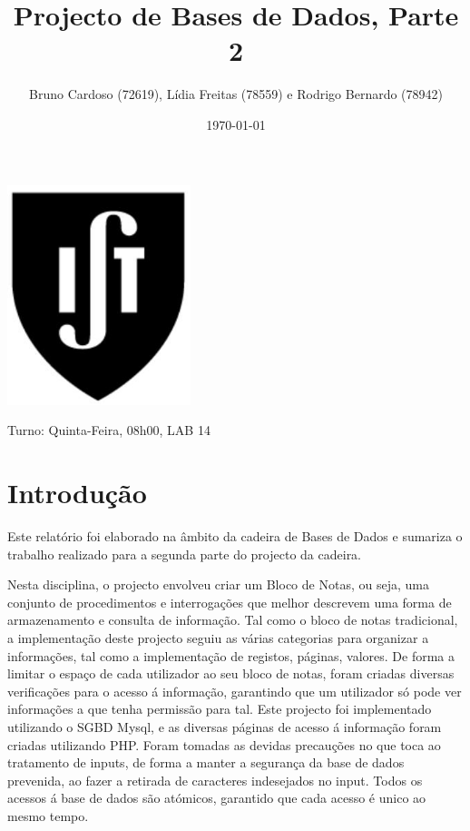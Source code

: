 \documentclass[11pt,a4paper]{article}
\title{\textbf{Projecto de Bases de Dados, Parte 2}}
\author{Bruno Cardoso (72619), Lídia Freitas (78559) e Rodrigo Bernardo (78942)}
\affil{Instituto Superior Técnico}
\begin{document}
\date {\today}

\maketitle
\thispagestyle{empty} %
\centerline{\includegraphics[width=0.4\textwidth]{ist-simbolo.jpg}}

\begin{description}[noitemsep]
	\item {}
	\item Turno: Quinta-Feira, 08h00, LAB 14
\end{description}

\newpage

\tableofcontents
\newpage

\section{Introdução}

Este relatório foi elaborado na âmbito da cadeira de Bases de Dados e sumariza o trabalho realizado para a segunda parte do projecto da cadeira.

Nesta disciplina, o projecto envolveu criar um Bloco de Notas, ou seja, uma conjunto de procedimentos e interrogações que melhor descrevem uma forma de armazenamento e consulta de informação. Tal como o bloco de notas tradicional, a implementação deste projecto seguiu as várias categorias para organizar a informações, tal como a implementação de registos, páginas, valores. De forma a limitar o espaço de cada utilizador ao seu bloco de notas, foram criadas diversas verificações para o acesso á informação, garantindo que um utilizador só pode ver informações a que tenha permissão para tal.
	Este projecto foi implementado utilizando o SGBD Mysql, e as diversas páginas de acesso á informação foram criadas utilizando PHP. Foram tomadas as devidas precauções no que toca ao tratamento de inputs, de forma a manter a segurança da base de dados prevenida, ao fazer a retirada de caracteres indesejados no input.
	Todos os acessos á base de dados são atómicos, garantido que cada acesso é unico ao mesmo tempo.
\end{document}
